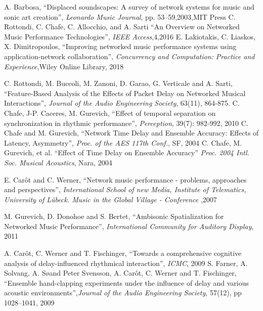 A. Barbosa, ``Displaced soundscapes: A survey of network systems for music and sonic art creation'',
\emph{Leonardo Music Journal},
pp. 53--59,2003,MIT Press
%
C. Rottondi, C. Chafe, C. Allocchio, and A. Sarti
``An Overview on Networked Music Performance Technologies'', \emph{IEEE Access},4,2016
%
E. Lakiotakis, C. Liaskos, X. Dimitropoulos, ``Improving networked music performance systems using application-network collaboration'', \emph{Concurrency and Computation: Practice and Experience},Wiley Online Library, 2018

C. Rottondi, M. Buccoli, M. Zanoni, D. Garao,  G. Verticale and A. Sarti, ``Feature-Based Analysis of the Effects of Packet Delay on Networked Musical Interactions'', \emph{Journal of the Audio Engineering Society}, 63(11), 864-875.
C. Chafe, J-P. Caceres, M. Gurevich, ``Effect of temporal separation on synchronization in rhythmic performance'',
\emph{Perception}, 39(7): 982-992, 2010
%
C. Chafe and M. Gurevich, ``Network Time Delay and Ensemble Accuracy: Effects of Latency, Asymmetry'', \emph{Proc. of the AES 117th Conf.}, SF, 2004
%
C. Chafe, M. Gurevich, et al. ``Effect of Time Delay on Ensemble Accuracy''
\emph{Proc. 2004 Intl. Soc. Musical Acoustics}, Nara, 2004

E. Car\^ot and C. Werner, ``Network music performance - problems, approaches and perspectives'',
\emph{International School of new Media, Institute of Telematics, University of Lübeck. Music in the Global Village - Conference} ,2007
%

M. Gurevich, D. Donohoe and S. Bertet, ``Ambisonic Spatialization for Networked Music Performance'', \emph{International Community for Auditory Display}, 2011

A. Car{\^o}t, C. Werner and T. Fischinger, ``Towards a comprehensive cognitive analysis of delay-influenced rhythmical interaction'', \emph{ICMC}, 2009
%
S. Farner, A. Solvang, A. S\aeb\o and Peter Svensson, A. Car{\^o}t, C. Werner and T. Fischinger, ``Ensemble hand-clapping experiments under the influence of delay and various acoustic
environments'',\emph{Journal of the Audio Engineering Society}, 57(12), pp 1028--1041, 2009

